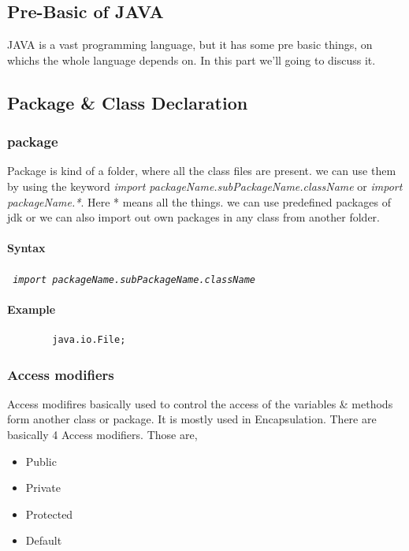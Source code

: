 \documentclass[openany]{book}  %
\begin{document}
\begin{flushleft}
    \part{Pre-Basic of JAVA}

    JAVA is a vast programming language, but it has some pre basic things, on whichs the whole language depends on. In this part we'll going to discuss it.

    \chapter{Package \& Class Declaration}

    \section{package}
    Package is kind of a folder, where all the class files are present. we can use them by using the keyword \textit{import packageName.subPackageName.className} or
    \textit{import packageName.*}. Here * means all the things. we can use predefined packages of jdk or we can also import out own packages in any class from another folder.
    \subsection{Syntax}
    \begin{center}
        \tt{
            \textit{import packageName.subPackageName.className}
        }
    \end{center}
    \subsection{Example}
    \begin{center}
        \begin{verbatim}
        java.io.File;
    \end{verbatim}
    \end{center}

    \section{Access modifiers}
    Access modifires basically used to control the access of the variables \& methods form another class or package. It is mostly used in Encapsulation.
    There are basically 4 Access modifiers. Those are,
    \begin{itemize}
        \item Public
        \item Private
        \item Protected
        \item Default
    \end{itemize}

\end{flushleft}
\end{document}
